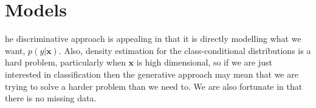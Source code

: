 \chapter{Models}

he discriminative approach is appealing
in that it is directly modelling what we want,
$p(y|\textbf{x})$. Also, density estimation for the class-conditional distributions is a hard problem, particularly when $\textbf{x}$ is high dimensional, so if we are just interested in classification then the generative approach may mean that we are trying to solve a harder problem than we need to\cite{Williams}. We are also fortunate in that there is no missing data. 